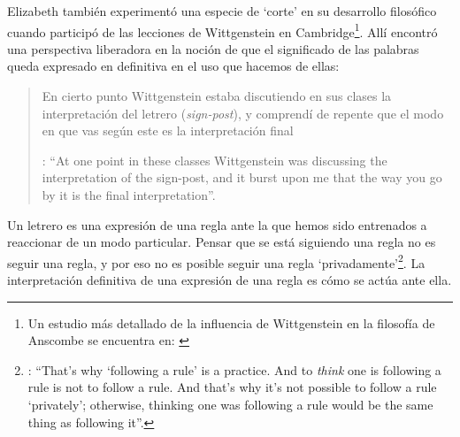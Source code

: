 Elizabeth también experimentó una especie de `corte' en su desarrollo filosófico cuando participó de las lecciones de Wittgenstein en Cambridge\footnote{Un estudio más detallado de la influencia de Wittgenstein en la filosofía de Anscombe se encuentra en: \Cite[37-95]{grimi2014dl}}. Allí encontró una perspectiva liberadora en la noción de que el significado de las palabras queda expresado en definitiva en el uso que hacemos de ellas: \blockquote[{\Cite[viii]{anscombe1981metaphysics}}: \enquote{At one point in these classes Wittgenstein was discussing the interpretation of the sign-post, and it burst upon me that the way you go by it is the final interpretation}.]{En cierto punto Wittgenstein estaba discutiendo en sus clases la interpretación del letrero (\emph{sign-post}), y comprendí de repente que el modo en que vas según este es la interpretación final}. Un letrero es una expresión de una regla ante la que hemos sido entrenados a reaccionar de un modo particular. Pensar que se está siguiendo una regla no es seguir una regla, y por eso no es posible seguir una regla `privadamente'\footnote{\cite[Cf.][\S202]{wittgenstein1953phiinv}: \enquote{That's why `following a rule' is a practice. And to \emph{think} one is following a rule is not to follow a rule. And that's why it's not possible to follow a rule `privately'; otherwise, thinking one was following a rule would be the same thing as following it}.}. La interpretación definitiva de una expresión de una regla es cómo se actúa ante ella.


